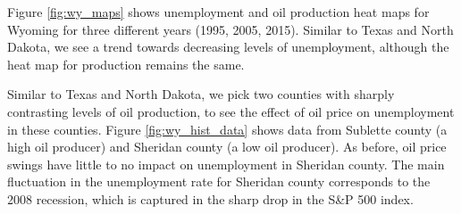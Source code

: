 \documentclass[11pt,letterpaper]{article}
\begin{document}
Figure \ref{fig:wy_maps} shows unemployment and oil production heat maps for Wyoming for three different years (1995, 2005, 2015). Similar to Texas and North Dakota, we see a trend towards decreasing levels of unemployment, although the heat map for production remains the same. 

Similar to Texas and North Dakota, we pick two counties with sharply contrasting levels of oil production, to see the effect of oil price on unemployment in these counties. Figure \ref{fig:wy_hist_data} shows data from Sublette county (a high oil producer) and Sheridan county (a low oil producer). As before, oil price swings have little to no impact on unemployment in Sheridan county. The main fluctuation in the unemployment rate for Sheridan county corresponds to the 2008 recession, which is captured in the sharp drop in the S\&P 500 index.
\end{document}
